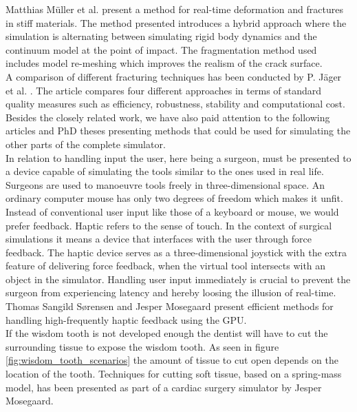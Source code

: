 Matthias Müller et al.  present a method for
real-time deformation and fractures in stiff materials. The method
presented introduces a hybrid approach where the simulation is
alternating between simulating rigid body dynamics and the
continuum model at the point of impact. The fragmentation method used
includes model re-meshing which improves the realism of the crack
surface. \\ 

A comparison of different fracturing techniques has
been conducted by P. Jäger et al. . The article
compares four different approaches in terms of standard quality
measures such as efficiency, robustness, stability and computational
cost.\\ 

Besides the closely related work, we have also paid attention to the
following articles and PhD theses presenting methods that could be
used for simulating the other parts of the complete simulator. \\

In relation to handling input the user, here being a surgeon,
must be presented to a device capable of simulating the tools similar
to the ones used in real life. Surgeons are used to manoeuvre tools
freely in three-dimensional space. An ordinary computer 
mouse has only two degrees of freedom which makes it unfit. Instead of
conventional user input like those of a keyboard or mouse,
we would prefer  feedback. Haptic refers to the sense of
touch. In the context of surgical simulations it means a device that
interfaces with the user through force feedback. The haptic device
serves as a three-dimensional joystick with the extra feature of
delivering force feedback, when the virtual tool
intersects with an object in the simulator.
Handling user input immediately is crucial to prevent the surgeon from
experiencing latency and hereby loosing the illusion of real-time.   
Thomas Sangild Sørensen and Jesper
Mosegaard present efficient methods for
handling high-frequently haptic feedback using the GPU. \\

If the wisdom tooth is not developed enough the dentist will have to
cut the surrounding tissue to expose the wisdom tooth. As seen in figure
\vref{fig:wisdom_tooth_scenarios} the amount of tissue to cut open depends on the
location of the tooth.
Techniques for cutting soft tissue, based on a spring-mass model, has
been presented as part of a cardiac surgery simulator by Jesper
Mosegaard. \\ 

